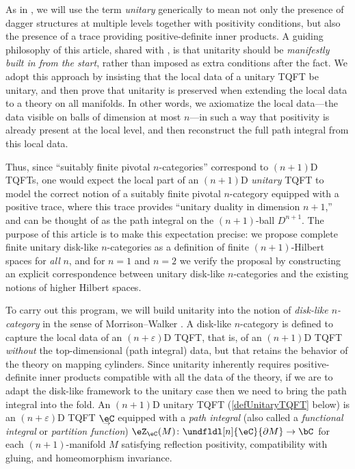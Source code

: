 \documentclass[12pt,reqno]{amsart}
\newcommand{\C}{\eC}
\newcommand{\Z}{\eZ}
\newcommand{\e}{\varepsilon}
\newcommand{\defn}[1]{\emph{#1}}
\newcommand{\undCtemp}{\bgroup\smash[b]{\text{$\underset{\smash{\raisebox{.225em}{$\scriptstyle\kern.05ex\rightarrow$}}}{\smash{\C}}$}}\egroup}
\newcommand{\undC}{\vphantom{\C}{\undCtemp}}
\begin{document}
As in \cite{3Hilb}, we will use the term \defn{unitary} generically to mean not only the presence of dagger structures at multiple levels together with positivity conditions, but also the presence of a trace providing positive-definite inner products. A guiding philosophy of this article, shared with \cite{3Hilb}, is that unitarity should be \emph{manifestly built in from the start}, rather than imposed as extra conditions after the fact. We adopt this approach by insisting that the local data of a unitary TQFT be unitary, and then prove that unitarity is preserved when extending the local data to a theory on all manifolds. In other words, we axiomatize the local data---the data visible on balls of dimension at most $n$---in such a way that positivity is already present at the local level, and then reconstruct the full path integral from this local data.

Thus, since ``suitably finite pivotal $n$-categories'' correspond to $(n+1)$D TQFTs, one would expect the local part of an $(n+1)$D \emph{unitary} TQFT to model the correct notion of a suitably finite pivotal $n$-category equipped with a positive trace, where this trace provides ``unitary duality in dimension $n+1$,'' and can be thought of as the path integral on the $(n+1)$-ball $D^{n+1}$. The purpose of this article is to make this expectation precise: we propose complete finite unitary disk-like $n$-categories as a definition of finite $(n+1)$-Hilbert spaces for \emph{all} $n$, and for $n = 1$ and $n = 2$ we verify the proposal by constructing an explicit correspondence between unitary disk-like $n$-categories and the existing notions of higher Hilbert spaces.

To carry out this program, we will build unitarity into the notion of \defn{disk-like $n$-category} in the sense of Morrison--Walker \cite{MW12}. A disk-like $n$-category is defined to capture the local data of an $(n+\e)$D TQFT, that is, of an $(n+1)$D TQFT \emph{without} the top-dimensional (path integral) data, but that retains the behavior of the theory on mapping cylinders. Since unitarity inherently requires positive-definite inner products compatible with all the data of the theory, if we are to adapt the disk-like framework to the unitary case then we need to bring the path integral into the fold. 
An $(n+1)$D unitary TQFT (\cref{defUnitaryTQFT} below) is an $(n+\e)$D TQFT $\undC$ equipped with a \defn{path integral} (also called a \defn{functional integral} or \defn{partition function}) $\Z_\C(M)\colon \undfldl[n]{\C}{\partial M}\to\bC$ for each $(n+1)$-manifold $M$ satisfying reflection positivity, compatibility with gluing, and homeomorphism invariance. 
\end{document}

